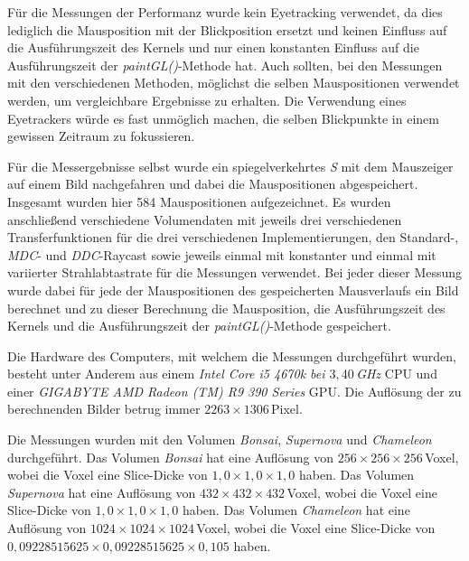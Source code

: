 Für die Messungen der Performanz wurde kein Eyetracking verwendet, da dies lediglich die Mausposition mit der Blickposition ersetzt und keinen Einfluss auf die Ausführungszeit des Kernels und nur einen konstanten Einfluss auf die Ausführungszeit der \emph{paintGL()}-Methode hat.
Auch sollten, bei den Messungen mit den verschiedenen Methoden, möglichst die selben Mauspositionen verwendet werden, um vergleichbare Ergebnisse zu erhalten.
Die Verwendung eines Eyetrackers würde es fast unmöglich machen, die selben Blickpunkte in einem gewissen Zeitraum zu fokussieren.

Für die Messergebnisse selbst wurde ein spiegelverkehrtes \emph{S} mit dem Mauszeiger auf einem Bild nachgefahren und dabei die Mauspositionen abgespeichert.
Insgesamt wurden hier 584 Mauspositionen aufgezeichnet.
Es wurden anschließend verschiedene Volumendaten mit jeweils drei verschiedenen Transferfunktionen für die drei verschiedenen Implementierungen, den Standard-, \emph{MDC}- und \emph{DDC}-Raycast sowie jeweils einmal mit konstanter und einmal mit variierter Strahlabtastrate für die Messungen verwendet.
Bei jeder dieser Messung wurde dabei für jede der Mauspositionen des gespeicherten Mausverlaufs ein Bild berechnet und zu dieser Berechnung die Mausposition, die Ausführungszeit des Kernels und die Ausführungszeit der \emph{paintGL()}-Methode gespeichert.

Die Hardware des Computers, mit welchem die Messungen durchgeführt wurden, besteht unter Anderem aus einem \emph{Intel Core i5 4670k bei $3,40$\,GHz} CPU und einer \emph{GIGABYTE AMD Radeon (TM) R9 390 Series} GPU.
Die Auflösung der zu berechnenden Bilder betrug immer $2263\times1306$\,Pixel.

Die Messungen wurden mit den Volumen \emph{Bonsai}, \emph{Supernova} und \emph{Chameleon} durchgeführt.
Das Volumen \emph{Bonsai} hat eine Auflösung von $256\times256\times256$\,Voxel, wobei die Voxel eine Slice-Dicke von $1,0\times1,0\times1,0$ haben.
Das Volumen \emph{Supernova} hat eine Auflösung von $432\times432\times432$\,Voxel, wobei die Voxel eine Slice-Dicke von $1,0\times1,0\times1,0$ haben.
Das Volumen \emph{Chameleon} hat eine Auflösung von $1024\times1024\times1024$\,Voxel, wobei die Voxel eine Slice-Dicke von $0,09228515625\times0,09228515625\times0,105$ haben.


